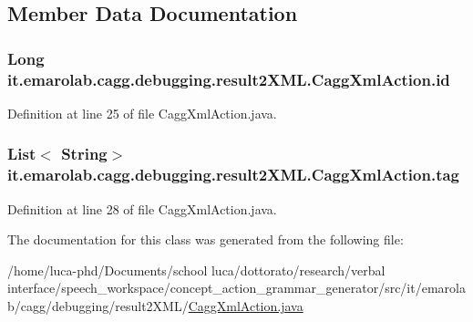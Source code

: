 \subsection{Member Data Documentation}
\hypertarget{classit_1_1emarolab_1_1cagg_1_1debugging_1_1result2XML_1_1CaggXmlAction_a2b15660ca15668e40dccd89970b3ac9c}{
\subsubsection[{id}]{\setlength{\rightskip}{0pt plus 5cm}Long it.\-emarolab.\-cagg.\-debugging.\-result2\-X\-M\-L.\-Cagg\-Xml\-Action.\-id\hspace{0.3cm}{\ttfamily [private]}}}\label{classit_1_1emarolab_1_1cagg_1_1debugging_1_1result2XML_1_1CaggXmlAction_a2b15660ca15668e40dccd89970b3ac9c}


Definition at line 25 of file Cagg\-Xml\-Action.\-java.

\hypertarget{classit_1_1emarolab_1_1cagg_1_1debugging_1_1result2XML_1_1CaggXmlAction_abd992cf43827fe2afb0ef8f7effef91e}{
\subsubsection[{tag}]{\setlength{\rightskip}{0pt plus 5cm}List$<$ String$>$ it.\-emarolab.\-cagg.\-debugging.\-result2\-X\-M\-L.\-Cagg\-Xml\-Action.\-tag\hspace{0.3cm}{\ttfamily [private]}}}\label{classit_1_1emarolab_1_1cagg_1_1debugging_1_1result2XML_1_1CaggXmlAction_abd992cf43827fe2afb0ef8f7effef91e}


Definition at line 28 of file Cagg\-Xml\-Action.\-java.



The documentation for this class was generated from the following file\-:\begin{DoxyCompactItemize}
\item 
/home/luca-\/phd/\-Documents/school luca/dottorato/research/verbal interface/speech\-\_\-workspace/concept\-\_\-action\-\_\-grammar\-\_\-generator/src/it/emarolab/cagg/debugging/result2\-X\-M\-L/\hyperlink{CaggXmlAction_8java}{Cagg\-Xml\-Action.\-java}\end{DoxyCompactItemize}
